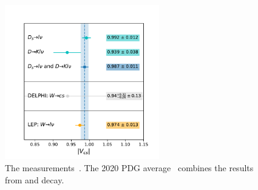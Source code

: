 \begin{figure}
    \centering
    \includegraphics[width=0.6\textwidth]{chapters/Introduction/sectionRelatedWorks/figures/vcs0.pdf}
    \caption{The \absVcs measurements~\cite{pdg2020}. The 2020 PDG average~\cite{pdg2020} combines the results from \PD and \PDs decay.}
    \label{fig:introduction:relatedWorks:vcs}
\end{figure}
